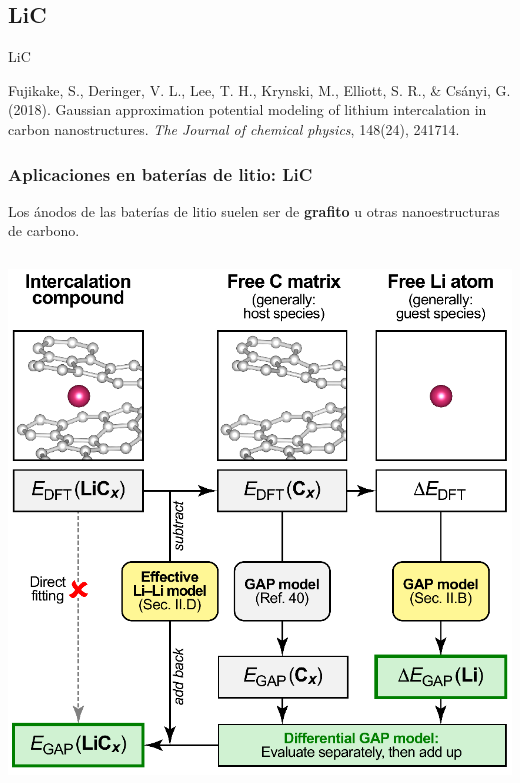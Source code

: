 \documentclass[aspectratio=169]{beamer}
\let\oldtextbf\textbf
\renewcommand{\textbf}[1]{\textcolor{nordblue}{\oldtextbf{#1}}}
\begin{document}
    \subsection{LiC}
    \begin{frame}
        \begin{center}
            {\huge LiC}
        \end{center}
        \tiny{
            Fujikake, S., Deringer, V. L., Lee, T. H., Krynski, M., 
            Elliott, S. R., \& Csányi, G. (2018). Gaussian approximation 
            potential modeling of lithium intercalation in carbon 
            nanostructures. \textit{The Journal of chemical physics}, 148(24), 241714.
        }
    \end{frame}
    
    \begin{frame}
        \frametitle{Aplicaciones en baterías de litio: LiC}
            
        Los ánodos de las baterías de litio suelen ser de \textbf{grafito} u otras
        nanoestructuras de carbono.
        
        \begin{columns}
            \begin{center}
                \includegraphics[width=\columnwidth]{LiC-metodo.png}
            \end{center}


\end{columns}
\end{frame}
\end{document}
